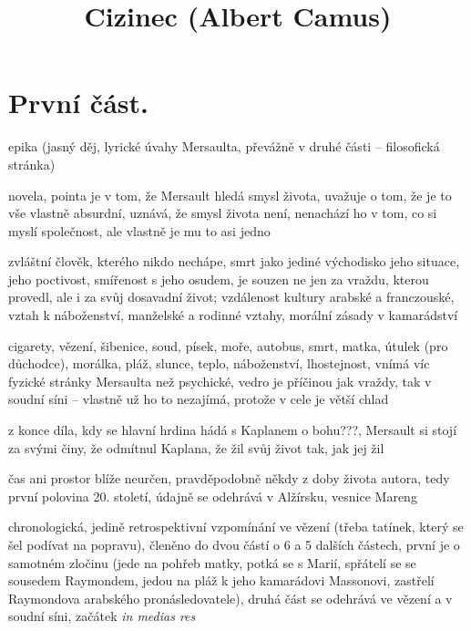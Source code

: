 \documentclass{article}
\title{\vspace{-2cm}Cizinec (Albert Camus)\vspace{-2cm}}
\date{}
\author{}
\begin{document}
\maketitle
\section{První část.}
\begin{description}
    \setlength\itemsep{0.15em}
    \item[druh:] epika (jasný děj, lyrické úvahy Mersaulta, převážně v druhé části -- filosofická stránka)
    \item[žánr:] novela, pointa je v tom, že Mersault hledá smysl života, uvažuje o tom, že je to vše vlastně absurdní, uznává, že smysl života není, nenachází ho v tom, co si myslí společnost, ale vlastně je mu to asi jedno
    \item[téma:] zvláštní člověk, kterého nikdo nechápe, smrt jako jediné východisko jeho situace, jeho poctivost, smířenost s jeho osudem, je souzen ne jen za vraždu, kterou provedl, ale i za svůj dosavadní život; vzdálenost kultury arabské a franczouské, vztah
    k náboženství, manželské a rodinné vztahy, morální zásady v kamarádství
    \item[motivy:] cigarety, vězení, šibenice, soud, písek, moře, autobus, smrt, matka, útulek (pro důchodce), morálka, pláž, slunce, teplo, náboženství, lhostejnost, vnímá víc fyzické stránky Mersaulta než psychické, vedro je příčinou jak vraždy, tak v soudní síni -- vlastně už ho to nezajímá, protože v cele je větší chlad
    \item[zařazení výňatku do kontextu díla:] z konce díla, kdy se hlavní hrdina hádá s Kaplanem o bohu???, Mersault si stojí za svými činy, že odmítnul Kaplana, že žil svůj život tak, jak jej žil
    \item[časoprostor:] čas ani prostor blíže neurčen, pravděpodobně někdy z doby života autora, tedy první polovina
        20. století, údajně se odehrává v Alžírsku, vesnice Mareng
    \item[kompoziční výstavba:] chronologická, jedině retrospektivní vzpomínání ve vězení (třeba tatínek, který se šel podívat na popravu), členěno do dvou částí o 6 a 5 dalších částech, první je o samotném zločinu
        (jede na pohřeb matky, potká se s Marií, spřátelí se se sousedem Raymondem, jedou na pláž k jeho kamarádovi
        Massonovi, zastřelí Raymondova arabského pronásledovatele), druhá část se odehrává ve vězení a v soudní
        síni, začátek \textit{in medias res}
\end{description}
\end{document}
